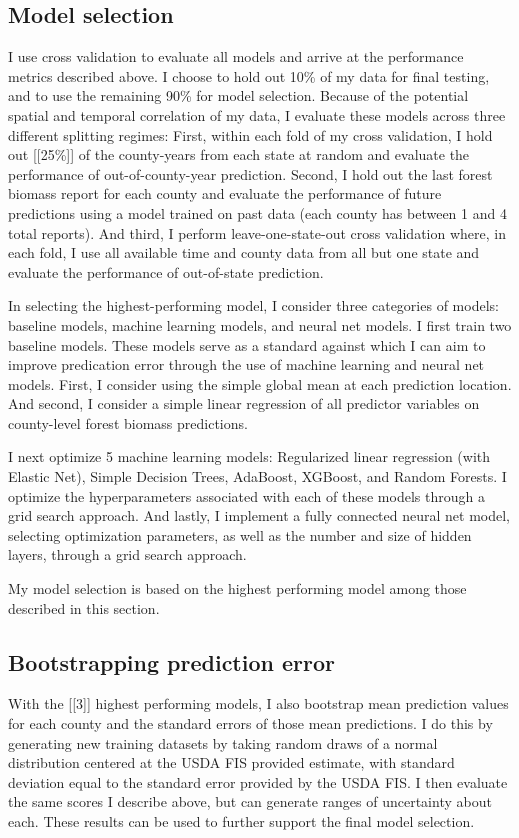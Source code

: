 \documentclass{article}
\begin{document}
\subsection{Model selection}
I use cross validation to evaluate all models and arrive at the performance metrics described above. I choose to hold out 10\% of my data for final testing, and to use the remaining 90\% for model selection. Because of the potential spatial and temporal correlation of my data, I evaluate these models across three different splitting regimes: First, within each fold of my cross validation, I hold out [[25\%]] of the county-years from each state at random and evaluate the performance of out-of-county-year prediction. Second, I hold out the last forest biomass report for each county and evaluate the performance of future predictions using a model trained on past data (each county has between 1 and 4 total reports). And third, I perform leave-one-state-out cross validation where, in each fold, I use all available time and county data from all but one state and evaluate the performance of out-of-state prediction.

In selecting the highest-performing model, I consider three categories of models: baseline models, machine learning models, and neural net models. I first train two baseline models. These models serve as a standard against which I can aim to improve predication error through the use of machine learning and neural net models. First, I consider using the simple global mean at each prediction location. And second, I consider a simple linear regression of all predictor variables on county-level forest biomass predictions.

I next optimize 5 machine learning models: Regularized linear regression (with Elastic Net), Simple Decision Trees, AdaBoost, XGBoost, and Random Forests.  I optimize the hyperparameters associated with each of these models through a grid search approach. And lastly, I implement a fully connected neural net model, selecting optimization parameters, as well as the number and size of hidden layers, through a grid search approach. 

My model selection is based on the highest performing model among those described in this section.

\subsection{Bootstrapping prediction error}

With the [[3]] highest performing models, I also bootstrap mean prediction values for each county and the standard errors of those mean predictions. I do this by generating new training datasets by taking random draws of a normal distribution centered at the USDA FIS provided estimate, with standard deviation equal to the standard error provided by the USDA FIS. I then evaluate the same scores I describe above, but can generate ranges of uncertainty about each. These results can be used to further support the final model selection.
\end{document}
